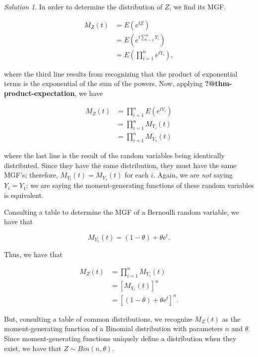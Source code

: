 \documentclass[
  letterpaper,
  DIV=11,
  numbers=noendperiod]{scrreprt}
\theoremstyle{plain}
\theoremstyle{definition}
\theoremstyle{definition}
\theoremstyle{remark}
\newtheorem*{solution}{Solution}
\begin{document}
\begin{solution}

In order to determine the distribution of \(Z\), we find its MGF.

\[
\begin{aligned}
  M_Z(t)
    &= E\left(e^{tZ}\right) \\
    &= E\left(e^{t\sum_{i=1}^{n} Y_i}\right) \\
    &= E\left(\prod_{i=1}^{n} e^{tY_i}\right),
\end{aligned}
\]

where the third line results from recognizing that the product of
exponential terms is the exponential of the sum of the powers. Now,
applying \textbf{?@thm-product-expectation}, we have

\[
\begin{aligned}
  M_Z(t)
    &= \prod_{i=1}^{n} E\left(e^{tY_i}\right) \\
    &= \prod_{i=1}^{n} M_{Y_i}(t) \\
    &= \prod_{i=1}^{n} M_{Y_1}(t)
\end{aligned}
\]

where the last line is the result of the random variables being
identically distributed. Since they have the same distribution, they
must have the same MGF's; therefore, \(M_{Y_i}(t) = M_{Y_1}(t)\) for
each \(i\). Again, we are \emph{not} saying \(Y_i = Y_1\); we are saying
the moment-generating functions of these random variables is equivalent.

Consulting a table to determine the MGF of a Bernoulli random variable,
we have that

\[M_{Y_1}(t) = (1 - \theta) + \theta e^t.\]

Thus, we have that

\[
\begin{aligned}
  M_Z(t)
    &= \prod_{i=1}^{n} M_{Y_1}(t) \\
    &= \left[M_{Y_1}(t)\right]^n \\
    &= \left[(1 - \theta) + \theta e^{t}\right]^n.
\end{aligned}
\]

But, consulting a table of common distributions, we recognize \(M_Z(t)\)
as the moment-generating function of a Binomial distribution with
parameters \(n\) and \(\theta\). Since moment-generating functions
uniquely define a distribution when they exist, we have that
\(Z \sim Bin(n, \theta)\).

\end{solution}
\end{document}
